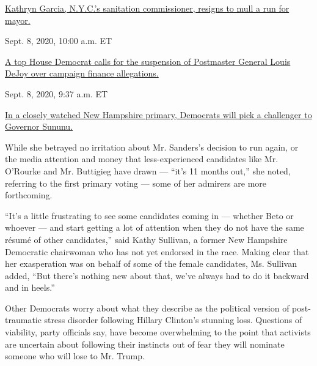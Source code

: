\href{https://www.nytimes3xbfgragh.onion/live/2020/09/08/us/trump-vs-biden\#kathryn-garcia-nycs-sanitation-commissioner-resigns-to-mull-a-run-for-mayor}{Kathryn
Garcia, N.Y.C.'s sanitation commissioner, resigns to mull a run for
mayor.}\href{https://www.nytimes3xbfgragh.onion/live/2020/09/08/us/trump-vs-biden\#a-top-house-democrat-calls-for-the-suspension-of-postmaster-general-louis-dejoy-over-campaign-finance-allegations}{}

Sept. 8, 2020, 10:00 a.m. ET

\href{https://www.nytimes3xbfgragh.onion/live/2020/09/08/us/trump-vs-biden\#a-top-house-democrat-calls-for-the-suspension-of-postmaster-general-louis-dejoy-over-campaign-finance-allegations}{A
top House Democrat calls for the suspension of Postmaster General Louis
DeJoy over campaign finance
allegations.}\href{https://www.nytimes3xbfgragh.onion/live/2020/09/08/us/trump-vs-biden\#in-a-closely-watched-new-hampshire-primary-democrats-will-pick-a-challenger-to-governor-sununu}{}

Sept. 8, 2020, 9:37 a.m. ET

\href{https://www.nytimes3xbfgragh.onion/live/2020/09/08/us/trump-vs-biden\#in-a-closely-watched-new-hampshire-primary-democrats-will-pick-a-challenger-to-governor-sununu}{In
a closely watched New Hampshire primary, Democrats will pick a
challenger to Governor Sununu.}

While she betrayed no irritation about Mr. Sanders's decision to run
again, or the media attention and money that less-experienced candidates
like Mr. O'Rourke and Mr. Buttigieg have drawn --- ``it's 11 months
out,'' she noted, referring to the first primary voting --- some of her
admirers are more forthcoming.

``It's a little frustrating to see some candidates coming in --- whether
Beto or whoever --- and start getting a lot of attention when they do
not have the same résumé of other candidates,'' said Kathy Sullivan, a
former New Hampshire Democratic chairwoman who has not yet endorsed in
the race. Making clear that her exasperation was on behalf of some of
the female candidates, Ms. Sullivan added, ``But there's nothing new
about that, we've always had to do it backward and in heels.''

Other Democrats worry about what they describe as the political version
of post-traumatic stress disorder following Hillary Clinton's stunning
loss. Questions of viability, party officials say, have become
overwhelming to the point that activists are uncertain about following
their instincts out of fear they will nominate someone who will lose to
Mr. Trump.


